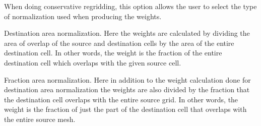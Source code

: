 \documentclass[letterpaper,10pt,english]{sphinxmanual}
\begin{document}
\begin{fulllineitems}
\label{\detokenize{NormType:ESMF.api.constants.NormType}}
When doing conservative regridding, this option allows the user
to select the type of normalization used when producing the weights.

\begin{fulllineitems}
\label{\detokenize{NormType:ESMF.api.constants.NormType.DSTAREA}}
Destination area normalization. Here the weights are calculated by dividing
the area of overlap of the source and destination cells by the area of the
entire destination cell. In other words, the weight is the fraction of the
entire destination cell which overlaps with the given source cell.

\end{fulllineitems}


\begin{fulllineitems}
\label{\detokenize{NormType:ESMF.api.constants.NormType.FRACAREA}}
Fraction area normalization. Here in addition to the weight calculation
done for destination area normalization the weights are also divided by the
fraction that the destination cell overlaps with the entire source grid. In
other words, the weight is the fraction of just the part of the destination
cell that overlaps with the entire source mesh.

\end{fulllineitems}


\end{fulllineitems}
\end{document}
